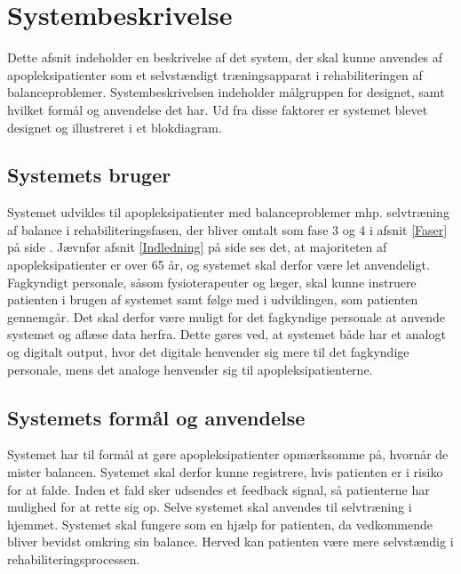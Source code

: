 \section{Systembeskrivelse}  
Dette afsnit indeholder en beskrivelse af det system, der skal kunne anvendes af apopleksipatienter som et selvstændigt træningsapparat i rehabiliteringen af balanceproblemer. Systembeskrivelsen indeholder målgruppen for designet, samt hvilket formål og anvendelse det har. Ud fra disse faktorer er systemet blevet designet og illustreret i et blokdiagram. 

\subsection{Systemets bruger}
Systemet udvikles til apopleksipatienter med balanceproblemer mhp. selvtræning af balance i rehabiliteringsfasen, der bliver omtalt som fase 3 og 4 i afsnit \ref{Faser} på side \pageref{Faser}. Jævnfør afsnit \ref{Indledning} på side \pageref{Indledning} ses det, at majoriteten af apopleksipatienter er over 65 år, og systemet skal derfor være let anvendeligt. Fagkyndigt personale, såsom fysioterapeuter og læger, skal kunne instruere patienten i brugen af systemet samt følge med i udviklingen, som patienten gennemgår. Det skal derfor være muligt for det fagkyndige personale at anvende systemet og aflæse data herfra. Dette gøres ved, at systemet både har et analogt og digitalt output, hvor det digitale henvender sig mere til det fagkyndige personale, mens det analoge henvender sig til apopleksipatienterne. 

\subsection{Systemets formål og anvendelse}
Systemet har til formål at gøre apopleksipatienter opmærksomme på, hvornår de mister balancen. Systemet skal derfor kunne registrere, hvis patienten er i risiko for at falde. Inden et fald sker udsendes et feedback signal, så patienterne har mulighed for at rette sig op. Selve systemet skal anvendes til selvtræning i hjemmet. Systemet skal fungere som en hjælp for patienten, da vedkommende bliver bevidst omkring sin balance. Herved kan patienten være mere selvstændig i rehabiliteringsprocessen.

